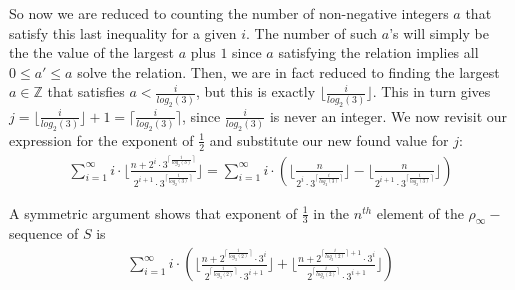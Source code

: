 So now we are reduced to counting the number of non-negative integers $a$ that satisfy this last inequality for a given $i$.  The number of such $a$'s will simply be the the value of the largest $a$ plus $1$ since $a$ satisfying the relation implies all $0 \leq a' \leq a$ solve the relation. Then, we are in fact reduced to finding the largest $a \in \mathbb{Z}$ that satisfies $a < \frac{i}{log_2(3)}$, but this is exactly $\lfloor \frac{i}{log_2(3)}\rfloor$. This in turn gives $j =  \lfloor \frac{i}{log_2(3)}\rfloor + 1= \lceil \frac{i}{log_2(3)}\rceil$, since $\frac{i}{log_2(3)}$ is never an integer. We now revisit our expression for the exponent of $\frac{1}{2}$ and substitute our new found value for $j$:\\

\begin{align} 
\sum_{i=1}^\infty i \cdot \lfloor\frac{n + 2^i \cdot 3^{\lceil \frac{i}{log_2(3)}\rceil}}{2^{i+1}\cdot 3^{\lceil \frac{i}{log_2(3)}\rceil}} \rfloor
=\sum_{i=1}^\infty i \cdot (\lfloor\frac{n}{2^i \cdot 3^{\lceil \frac{i}{log_2(3)}\rceil }}\rfloor -  \lfloor\frac{n}{2^{i+1}\cdot 3^{\lceil \frac{i}{log_2(3)}\rceil}} \rfloor)
\end{align}



A symmetric argument shows that exponent of $\frac{1}{3}$ in the $n^{th}$ element of the $\rho_\infty-$sequence of $S$ is\\ 

\begin{align} 
\sum_{i=1}^\infty i \cdot (\lfloor\frac{n + 2^{\lceil \frac{i}{log_3(2)}\rceil} \cdot 3^i}{2^{\lceil \frac{i}{log_3(2)}\rceil}\cdot 3^{i+1}} \rfloor + \lfloor\frac{n + 2^{\lceil \frac{i}{log_3(2)}\rceil+1} \cdot 3^i}{2^{\lceil \frac{i}{log_3(2)}\rceil}\cdot 3^{i+1}} \rfloor)
\end{align}

